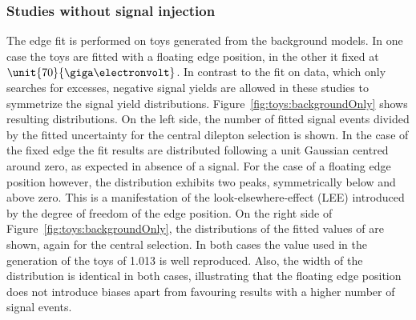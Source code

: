 \subsubsection{Studies without signal injection}
The edge fit is performed on toys generated from the background models. In one case the toys are fitted with a floating edge position, in the other it fixed at $\unit{70}{\giga\electronvolt}$. In contrast to the fit on data, which only searches for excesses, negative signal yields are allowed in these studies to symmetrize the signal yield distributions. Figure~\ref{fig:toys:backgroundOnly} shows resulting distributions. On the left side, the number of fitted signal events divided by the fitted uncertainty for the central dilepton selection is shown. In the case of the fixed edge the fit results are distributed following a unit Gaussian centred around zero, as expected in absence of a signal.  For the case of a floating edge position however, the distribution exhibits two peaks, symmetrically below and above zero. This is a manifestation of the look-elsewhere-effect (LEE) introduced by the degree of freedom of the edge position. On the right side of Figure~\ref{fig:toys:backgroundOnly}, the distributions of the fitted values of \Rsfof are shown, again for the central selection. In both cases the value used in the generation of the toys of 1.013 is well reproduced. Also, the width of the distribution is identical in both cases,  illustrating that the floating edge position does not introduce biases apart from favouring results with a higher number of signal events.
